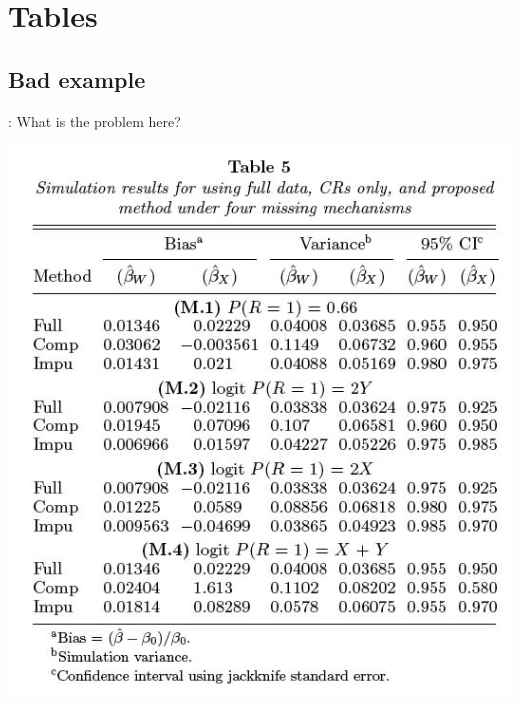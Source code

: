 \section{Tables}
\subsection{Bad example}
\begin{frame}{\secname: \subsecname}
What is the problem here? \\
\begin{center}
\includegraphics[scale=0.35]{image/paik_tab5}
\end{center}
\end{frame}

